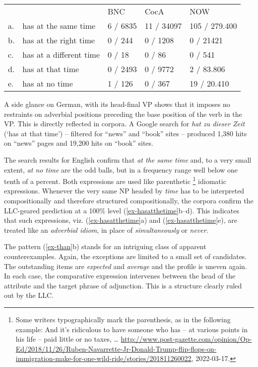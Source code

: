 \documentclass[output=paper
  ,nobabel
  ,uniformtopskip %
]{langscibook}
\begin{document}
\eal\label{ex-hasatthetime}%
\begin{tabular}[t]{lllll}
& & BNC & CocA & NOW \\
a. & has at the same time & 6 / 6835 & 11 / 34097 & 105 / 279.400\\
b. & has at the right time & 0 / 244 & 0 / 1208 & 0 / 21421\\
c. & has at a different time & 0 / 18 & 0 / 86 & 0 / 541\\
d. & has at that time & 0 / 2493 & 0 / 9772 & 2 / 83.806\\
e. & has at no time & 1 / 126 & 0 / 367 & 19 / 20.410
\end{tabular}
\zl

\noindent
A side glance on German, with its head-final VP shows that it imposes no restraints on adverbial positions preceding the base position of the verb in the VP. This is directly reflected in corpora. A Google search for \emph{hat zu dieser Zeit} (‘has at that time’) – filtered for ``news'' and ``book'' sites – produced 1,380 hits on ``news'' pages and 19,200 hits on ``book'' sites.

The search results for English confirm that \emph{at the same time} and, to a very small extent, \emph{at no time} are the odd balls, but in a frequency range well below one tenth of a percent. Both expressions are used like parenthetic%
%
\footnote{Some writers typographically mark the parenthesis, as in the following example:
\ea And it's ridiculous to have someone who has – at various points in his life – paid little or no taxes, \ldots
\z
\url{http://www.post-gazette.com/opinion/Op-Ed/2018/11/26/Ruben-Navarrette-Jr-Donald-Trump-flip-flops-on-immigration-make-for-one-wild-ride/stories/201811260022}, 2022-03-17.
}
idiomatic expressions. Whenever the very same NP headed by \emph{time} has to be interpreted compositionally and therefore structured compositionally, the corpora confirm the LLC-geared prediction at a 100\% level (\ref{ex-hasatthetime}b–d). This indicates that such expressions, viz. (\ref{ex-hasatthetime}a) and (\ref{ex-hasatthetime}e), are treated like an \emph{adverbial idiom}, in place of \emph{simultaneously} or \emph{never}.

The pattern (\ref{ex-than}b) stands for an intriguing class of apparent counterexamples. Again, the exceptions are limited to a small set of candidates. The outstanding items are \emph{expected} and \emph{average} and the profile is uneven again. In each case, the comparative expression intervenes between the head of the attribute and the target phrase of adjunction. This is a structure clearly ruled out by the LLC.
\end{document}
